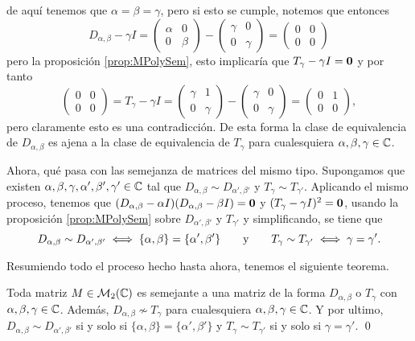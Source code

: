 de aquí tenemos que $\alpha = \beta = \gamma$, pero si esto se cumple, notemos que entonces
\[
  D_{\alpha,\beta} - \gamma I = \begin{pmatrix} \alpha & 0 \\ 0 & \beta \end{pmatrix} - \begin{pmatrix} \gamma & 0 \\ 0 & \gamma \end{pmatrix}
  = \begin{pmatrix} 0 & 0 \\ 0 & 0 \end{pmatrix}
\]
pero la proposición \ref{prop:MPolySem}, esto implicaría que $T_\gamma - \gamma I  = \mathbf{0}$ y por tanto
\[
  \begin{pmatrix} 0 & 0 \\ 0 & 0 \end{pmatrix} = T_\gamma - \gamma I = \begin{pmatrix} \gamma & 1 \\ 0 & \gamma \end{pmatrix} - \begin{pmatrix} \gamma & 0 \\ 0 & \gamma \end{pmatrix} = \begin{pmatrix}
    0 & 1 \\ 0 & 0 \end{pmatrix},
\]
pero claramente esto es una contradicción. De esta forma la clase de equivalencia de $D_{\alpha,\beta}$ es ajena a la clase de equivalencia de $T_\gamma$ para cualesquiera $\alpha,\beta,\gamma \in \mathbb{C}$.

Ahora, qué pasa con las semejanza de matrices del mismo tipo. Supongamos que existen $\alpha, \beta, \gamma, \alpha', \beta', \gamma' \in \mathbb{C}$ tal que $D_{\alpha,\beta} \sim D_{\alpha',\beta'}$ y $T_\gamma \sim T_{\gamma'}$. Aplicando el mismo proceso, tenemos que $(D_{\alpha,\beta} - \alpha I)(D_{\alpha,\beta} - \beta I) = \mathbf{0}$ y $(T_\gamma - \gamma I)^2 = \mathbf{0}$, usando la proposición \ref{prop:MPolySem} sobre $D_{\alpha',\beta'}$ y $T_{\gamma'}$ y simplificando, se tiene que 
\[
  D_{\alpha,\beta} \sim D_{\alpha',\beta'} \iff \{\alpha,\beta\} = \{\alpha',\beta'\}
    \qquad\text{y}\qquad
  T_\gamma \sim T_{\gamma'} \iff \gamma = \gamma'.
\]

Resumiendo todo el proceso hecho hasta ahora, tenemos el siguiente teorema.
\begin{teor} \label{teor:TDMat2x2}
  Toda matriz $M \in \mathcal{M}_2(\mathbb{C})$ es semejante a una matriz de la forma $D_{\alpha,\beta}$ o $T_\gamma$ con $\alpha, \beta, \gamma \in \mathbb{C}$. Además, $D_{\alpha,\beta} \nsim T_\gamma$ para cualesquiera $\alpha,\beta,\gamma \in \mathbb{C}$. Y por ultimo, $D_{\alpha,\beta} \sim D_{\alpha',\beta'}$ si y solo si $\{\alpha,\beta\} = \{\alpha',\beta'\}$ y $T_\gamma \sim T_{\gamma'}$ si y solo si $\gamma = \gamma'$. \qed
\end{teor}

